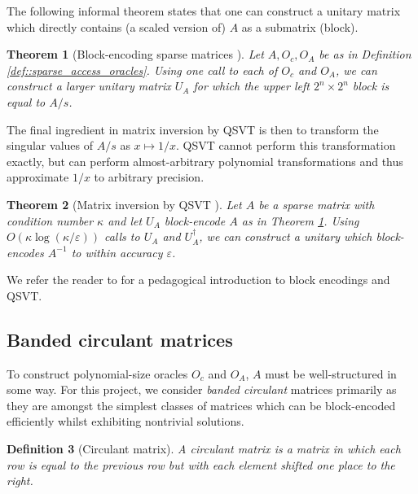 \documentclass[10pt, twocolumn]{article}
\newtheorem{theorem}{Theorem}[section]
\newtheorem{definition}[theorem]{Definition}
\begin{document}
The following informal theorem states that one can construct a unitary matrix which directly contains (a scaled version of) $A$ as a submatrix (block).

\begin{theorem}[Block-encoding sparse matrices \cite{gilyen2019quantum, camps2203explicit}]
	\label{thm::block_encoding_sparse_matrices}
	Let $A, O_c, O_A$ be as in Definition \ref{def::sparse_access_oracles}. Using one call to each of $O_c$ and $O_A$, we can construct a larger unitary matrix $U_A$ for which the upper left $2^n \times 2^n$ block is equal to $A/s$.
\end{theorem}

The final ingredient in matrix inversion by QSVT is then to transform the singular values of $A/s$ as $x \mapsto 1/x$. QSVT cannot perform this transformation exactly, but can perform almost-arbitrary polynomial transformations \cite{sunderhauf2023generalized} and thus approximate $1/x$ to arbitrary precision.

\begin{theorem}[Matrix inversion by QSVT \cite{gilyen2019quantum}]
	\label{thm::matrix_inversion_by_qsvt}
	Let $A$ be a sparse matrix with condition number $\kappa$ and let $U_A$ block-encode $A$ as in Theorem \ref{thm::block_encoding_sparse_matrices}. Using $O(\kappa \log(\kappa / \varepsilon))$ calls to $U_A$ and $U_A^\dag$, we can construct a unitary which block-encodes $A^{-1}$ to within accuracy $\varepsilon$.
\end{theorem}

We refer the reader to \cite{martyn2021grand} for a pedagogical introduction to block encodings and QSVT.

\subsection{Banded circulant matrices}

To construct polynomial-size oracles $O_c$ and $O_A$, $A$ must be well-structured in some way. For this project, we consider \textit{banded circulant} matrices primarily as they are amongst the simplest classes of matrices which can be block-encoded efficiently whilst exhibiting nontrivial solutions.

\begin{definition}[Circulant matrix]
	A circulant matrix is a matrix in which each row is equal to the previous row but with each element shifted one place to the right.
\end{definition}
\end{document}

